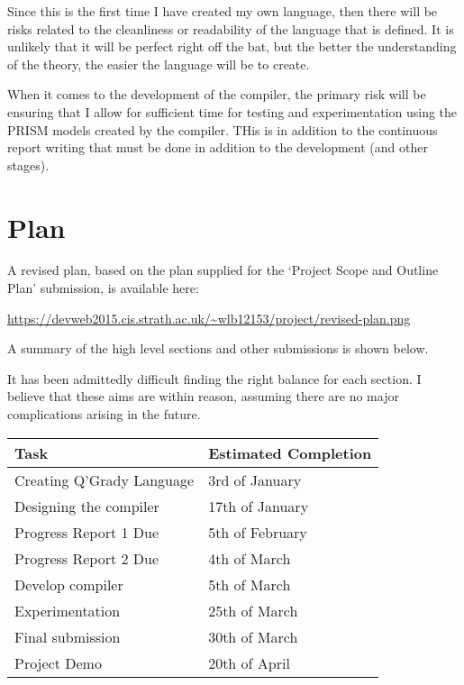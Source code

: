 \documentclass[11pt, a4paper]{article}
\begin{document}
Since this is the first time I have created my own language, then there will be
risks related to the cleanliness or readability of the language that is defined.
It is unlikely that it will be perfect right off the bat, but the better the
understanding of the theory, the easier the language will be to create.

When it comes to the development of the compiler, the primary risk will be
ensuring that I allow for sufficient time for testing and experimentation using
the PRISM models created by the compiler. THis is in addition to the continuous
report writing that must be done in addition to the development (and other
stages).


\section{Plan} %
\label{sec:plan}
A revised plan, based on the plan supplied for the `Project Scope and Outline
Plan' submission, is available here:

\url{https://devweb2015.cis.strath.ac.uk/~wlb12153/project/revised-plan.png}

A summary of the high level sections and other submissions is shown below.

It has been admittedly difficult finding the right balance for each section. I
believe that these aims are within reason, assuming there are no major
complications arising in the future.
\begin{center}
    \begin{tabular}{l | p{7.5cm}}
        Task & Estimated Completion\\
        \hline
        Creating Q'Grady Language & 3rd of January \\

        Designing the compiler & 17th of January \\

        Progress Report 1 Due & 5th of February \\

        Progress Report 2 Due & 4th of March \\

        Develop compiler & 5th of March \\

        Experimentation & 25th of March \\

        Final submission & 30th of March \\

        Project Demo & 20th of April
\end{tabular}
\end{center}
\end{document}
